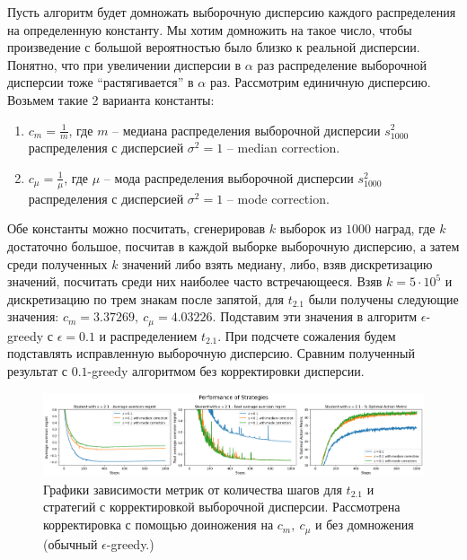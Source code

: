 \documentclass{article}
\begin{document}
Пусть алгоритм будет домножать выборочную дисперсию каждого распределения на определенную константу. Мы хотим домножить на такое число, чтобы произведение с большой вероятностью было близко к реальной дисперсии. Понятно, что при увеличении дисперсии в $\alpha$ раз распределение выборочной дисперсии тоже ``растягивается'' в $\alpha$ раз. Рассмотрим единичную дисперсию. Возьмем такие 2 варианта константы:
\begin{enumerate}
    \item $c_m = \frac{1}{m}$, где $m$ -- медиана распределения выборочной дисперсии $s_{1000}^2$ распределения с дисперсией $\sigma^2=1$ -- median correction.
    \item $c_{\mu} = \frac{1}{\mu}$, где $\mu$ -- мода распределения выборочной дисперсии $s_{1000}^2$ распределения с дисперсией $\sigma^2=1$ -- mode correction.
\end{enumerate}
Обе константы можно посчитать, сгенерировав $k$ выборок из $1000$ наград, где $k$ достаточно большое, посчитав в каждой выборке выборочную дисперсию, а затем среди полученных $k$ значений либо взять медиану, либо, взяв дискретизацию значений, посчитать среди них наиболее часто встречающееся. Взяв $k=5\cdot 10^{5}$ и дискретизацию по трем знакам после запятой, для $t_{2.1}$ были получены следующие значения: $c_m = 3.37269, \: c_{\mu} = 4.03226$. Подставим эти значения в алгоритм $\epsilon$-greedy с $\epsilon = 0.1$ и распределением $t_{2.1}$. При подсчете сожаления будем подставлять исправленную выборочную дисперсию. Сравним полученный результат с $0.1$-greedy алгоритмом без корректировки дисперсии.

\begin{figure}[h] %
\centering
\includegraphics[width=6in]{theory_tester/theory_images/correction_variance/strat_distr.png}
\caption{Графики зависимости метрик от количества шагов для $t_{2.1}$ и стратегий с корректировкой выборочной дисперсии. Рассмотрена корректировка с помощью доиножения на $c_m, \: c_{\mu}$ и без домножения (обычный $\epsilon$-greedy.)}
\label{fig:correction_aversion_strat_distr}
\end{figure}
\end{document}
